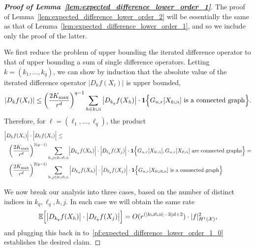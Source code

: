 \documentclass{article}
\newcommand{\abs}[1]{\left \lvert #1 \right \rvert}
\newcommand{\1}{\mathbf{1}}
\newcommand{\Xset}{\mathcal{X}}
\newcommand{\Ebb}{\mathbb{E}}
\theoremstyle{alden}
\theoremstyle{aldenthm}
\theoremstyle{definition}
\theoremstyle{remark}
\begin{document}
\begin{proof}[\textbf{Proof of Lemma~\ref{lem:expected_difference_lower_order_1}}]
	The proof of Lemma~\ref{lem:expected_difference_lower_order_2} will be essentially the same as that of Lemma~\ref{lem:expected_difference_lower_order_1}, and so we include only the proof of the latter.
	
	We first reduce the problem of upper bounding the iterated difference operator to that of upper bounding a sum of single difference operators. Letting $k = (k_1,\ldots,k_q)$, we can show by induction that the absolute value of the iterated difference operator $\abs{D_kf(X_i)}$ is upper bounded,
	\begin{equation*}
	\abs{D_kf(X_i)} \leq \left(\frac{2K_{\max}}{r^d}\right)^{q-1} \sum_{h \in k \cup i} \abs{D_{k_q}f(X_h)} \cdot \1\Bigl\{G_{n,r}[X_{k \cup i}]~\textrm{is a connected graph} \Bigr\}.
	\end{equation*}
	Therefore, for $\ell = (\ell_1,\ldots,\ell_q)$, the product
	\begin{align}
	& \Bigl|D_kf(X_i)\Bigr| \cdot \Bigl|D_{\ell}f(X_i)\Bigr| \leq \nonumber \\
	&~~ \left(\frac{2K_{\max}}{r^d}\right)^{2(q - 1)} \sum_{h,j \in k \cup \ell \cup i} \Bigl|D_{k_q}f(X_h)\Bigr| \cdot \Bigl|D_{\ell_q}f(X_j)\Bigr| \cdot \1\Bigl\{G_{n,r}[X_{k \cup i}], G_{n,r}[X_{\ell \cup i}]~\textrm{are connected graphs} \Bigr\} =  \nonumber \\
	&~~ \left(\frac{2K_{\max}}{r^d}\right)^{2(q - 1)} \sum_{h,j \in k \cup \ell \cup i} \Big|D_{k_q}f(X_h)\Bigr| \cdot \Bigl|D_{\ell_q}f(X_j)\Bigr| \cdot \1\Bigl\{G_{n,r}[X_{k \cup \ell \cup i}] ~\textrm{is a connected graph} \Bigr\} \label{pf:expected_difference_lower_order_1_0}
	\end{align}
	
	We now break our analysis into three cases, based on the number of distinct indices in $k_q,\ell_q,h,j$. In each case we will obtain the same rate
	\begin{equation*}
	\Ebb\Bigl[\abs{D_{k_q}f(X_h)} \cdot \abs{D_{\ell_q}f(X_j)}\Bigr] = O(r^{(\abs{k \cup \ell \cup i} - 3)d + 2}) \cdot |f|_{H^1(\Xset)}^2,
	\end{equation*}
	and plugging this back in to~\eqref{pf:expected_difference_lower_order_1_0} establishes the desired claim.


\end{proof}
\end{document}
